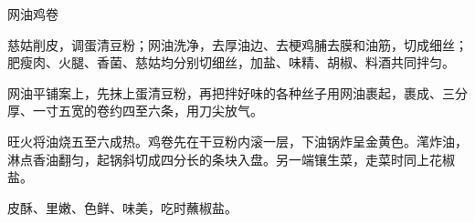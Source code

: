 %
%
%
%
%
%
%
\begin{recipe}{网油鸡卷}

\ingredients


\preparation

\step 慈姑削皮，调蛋清豆粉；网油洗净，去厚油边、去梗鸡脯去膜和油筋，切成细丝；
肥瘦肉、火腿、香菌、慈姑均分别切细丝，加盐、味精、胡椒、料酒共同拌匀。

\step 网油平铺案上，先抹上蛋清豆粉，再把拌好味的各种丝子用网油裹起，裹成、三分
厚、一寸五宽的卷约四至六条，用刀尖放气。

\step 旺火将油烧五至六成热。鸡卷先在干豆粉内滚一层，下油锅炸呈金黄色。滗炸油，
淋点香油翻匀，起锅斜切成四分长的条块入盘。另一端镶生菜，走菜时同上花椒盐。

\features

皮酥、里嫩、色鲜、味美，吃时蘸椒盐。

\end{recipe}

